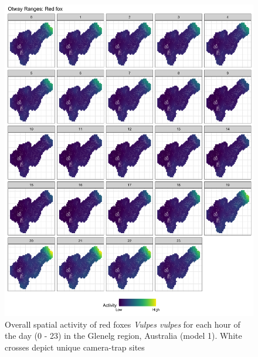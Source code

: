 \documentclass[]{elsarticle} %
\begin{document}
\begin{figure}

{\centering \includegraphics[width=1\linewidth]{../figs/spte_facet_o_fox} 

}

\caption{Overall spatial activity of red foxes \textit{Vulpes vulpes} for each hour of the day (0 - 23) in the Glenelg region, Australia (model 1). White crosses depict unique camera-trap sites}\label{fig:diel-space-g-fox}
\end{figure}

\newpage
\end{document}
